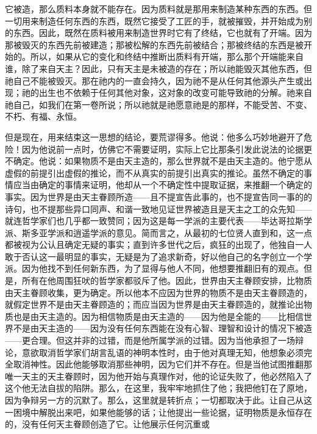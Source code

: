 它被造，那么质料本身就不能存在。因为质料就是那用来制造某种东西的东西。但一切用来制造任何东西的东西，既然它接受了工匠的手，就被摧毁，并开始成为别的东西。因此，既然在质料被用来制造世界时它有了终结，它也就有了开端。因为那被毁灭的东西先前被建造；那被松解的东西先前被结合；那被终结的东西是被开始的。所以，如果从它的变化和终结中推断出质料有开端，那么那个开端能来自谁，除了来自天主？因此，只有天主是未被造的存在；所以祂能毁灭其他东西，但祂自己不能被毁灭。那在祂内的一直会持久，因为祂不是从任何其他源头产生或出现；祂的出生也不依赖于任何其他对象，这对象的改变可能导致祂的分解。祂来自祂自己，如我们在第一卷所说；所以祂就是祂愿意祂是的那样，不能受苦、不变、不朽、有福、永恒。\par

但是现在，用来结束这一思想的结论，要荒谬得多。他说：他多么巧妙地避开了危险！因为他说前一点时，仿佛它不需要证明，实际上它比那条引发此说法的论据更不确定。他说：如果物质不是由天主造的，那么世界就不是由天主造的。他宁愿从虚假的前提引出虚假的推论，而不从真实的前提引出真实的推论。虽然不确定的事情应当由确定的事情来证明，他却从一个不确定性中提取证据，来推翻一个确定的事实。\newline{}因为世界是由天主眷顾所造——且不提宣告此事的，也不提宣告同一事的的诗句，也不提那些异口同声、和谐一致地见证世界被造且是天主之工的众先知——就连哲学家们也几乎都一致赞同；因为这是每一学派的主要代表——毕达哥拉斯学派、斯多亚学派和逍遥学派的意见。简而言之，从最初的七位贤人直到和，这一点都被视为公认且确定无疑的事实；直到许多世代之后，疯狂的出现了，他独自一人敢于否认这一最明显的事实，无疑是为了追求新奇，好以他自己的名字创立一个学派。因为他找不到任何新东西，为了显得与他人不同，他想要推翻旧有的观点。但是，所有在他周围狂吠的哲学家都驳斥了他。\newline{}因此，世界由天主眷顾安排，比物质由天主眷顾收集，更为确定。所以他本不应因为世界的物质不是由天主眷顾造的，就假定世界不是由天主眷顾造的；而应当因为世界是由天主眷顾造的，就推论出物质也是由天主造的。因为相信物质是由天主造的——因为他是全能的——比相信世界不是由天主造的——因为没有任何东西能在没有心智、理智和设计的情况下被造——更合理。但这并非的过错，而是他所属学派的过错。因为当他承担了一场辩论，意欲取消哲学家们胡言乱语的神明本性时，由于他对真理无知，他想象必须完全取消神性。因此他能够取消那些神明，因为它们并不存在。但是当他试图推翻那唯一天主的天主眷顾时，因为他开始与真理作对，他的论证失败了，他必然陷入了这个他无法自拔的陷阱。\newline{}那么，在这里，我牢牢地抓住了他；我把他钉在了原地，因为争辩另一方的沉默了。那么，这里就是转折点；一切都取决于此。让自己从这一困境中解脱出来吧，如果他能够的话；让他提出一些论据，证明物质是永恒存在的，没有任何天主眷顾创造了它。让他展示任何沉重或